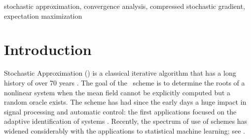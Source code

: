 \documentclass[10pt,twocolumn,twoside]{IEEEtran}
\begin{document}
\begin{IEEEkeywords}
stochastic approximation, convergence analysis, compressed stochastic gradient, expectation maximization
\end{IEEEkeywords}

\allowdisplaybreaks[4]






\section{Introduction}
Stochastic Approximation (\SA) is a classical iterative algorithm that has a long history of over 70 years \cite{robbins1951stochastic,blum1954multidimensional}. The goal of the \SA\ scheme is to determine the roots of a nonlinear system 
when the mean field
cannot be explicitly computed but a random oracle exists.
The {\SA} scheme has had since the early days a huge impact  in signal processing and automatic control: the first applications focused on the adaptive identification of systems \cite{ljung1977analysis,ljung1983theory,benveniste2012adaptive,haykin2002adaptive}.
Recently, the spectrum of use of {\SA} schemes has widened considerably with the applications to statistical machine learning; see \cite{bottou2003stochastic,bottou2010large,principe2011kernel}.


\end{document}
